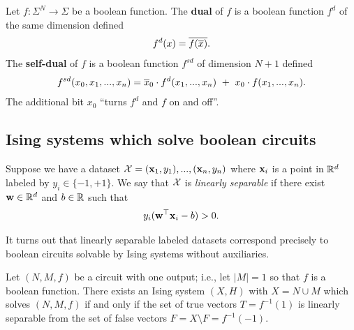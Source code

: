 \documentclass{article}
\begin{document}
\begin{defn}\label{defn:dual-selfdual}
  Let $f:\Sigma^N \to \Sigma$ be a boolean function. The \textbf{dual} of $f$ is a boolean function $f^d$ of the same dimension defined
  \begin{align*}
    f^d(x) = \overline{f(\overline{x})}.
  \end{align*}
  The \textbf{self-dual} of $f$ is a boolean function $f^{sd}$ of dimension $N+1$ defined
  \begin{align*}
    f^{sd}(x_0, x_1,...,x_n) = \overline{x}_0\cdot f^d(x_1,...,x_n) ~+~ x_0\cdot f(x_1,...,x_n).
  \end{align*}
  The additional bit $x_0$ ``turns $f^d$ and $f$ on and off''.
\end{defn}

\subsection{Ising systems which solve boolean circuits}
\begin{defn}\label{defn:linear_separability}
  Suppose we have a dataset $\mathcal{X} = (\mathbf{x}_1,y_1),...,(\mathbf{x}_n,y_n)$ where $\mathbf{x}_i$ is a point in $\mathbb{R}^d$ labeled by $y_i \in \{-1,+1\}$. We say that $\mathcal{X}$ is \emph{linearly separable} if there exist $\mathbf{w} \in \mathbb{R}^d$ and $b\in \mathbb{R}$ such that
  \begin{equation}\label{eqn:linear_separability_condition}
    y_i(\mathbf{w}^\top \mathbf{x}_i - b) > 0.
  \end{equation}
\end{defn}
It turns out that linearly separable labeled datasets correspond precisely to boolean circuits solvable by Ising systems without auxiliaries.
\begin{prop}\label{prop:boolean_ising_svm_equiv}
  Let $(N, M, f)$ be a circuit with one output; i.e., let $|M| = 1$ so that $f$ is a boolean function. There exists an Ising system $(X,H)$ with $X = N \cup M$ which solves $(N,M,f)$ if and only if the set of true vectors $T = f^{-1}(1)$ is linearly separable from the set of false vectors $F = X \setminus F = f^{-1}(-1)$.
\end{prop}
\end{document}
